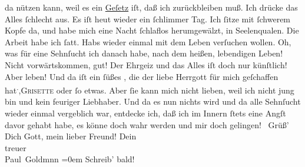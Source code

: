 \begin{ledgroupsized}[t]{13cm}
               da nützen kann, weil es ein \uline{Geſetz} iſt, daß ich
               zurückbleiben muß.\pend
           \pstart
           Ich drücke das Alles ſchlecht aus. Es iſt heut wieder
               ein ſchlimmer Tag. Ich ſitze mit ſchwerem Kopfe da, und habe mich eine Nacht
               ſchlaflos herumgewälzt, in Seelenqualen. Die Arbeit habe ich ſatt. Habs wieder einmal
               mit dem Leben verſuchen wollen. Oh, was für eine Sehnſucht ich danach habe, nach dem
               heißen, lebendigen {\pb}Leben! Nicht vorwärtskommen,
               gut! Der Ehrgeiz und das Alles iſt doch nur künſtlich! Aber leben! Und da iſt ein
               ſüßes \label{K_L02758-111v}\label{K_L02758-111h}, die der
               liebe Herrgott für mich geſchaffen hat\substVorne{}\textsuperscript{.}\substDazwischen{},\substHinten{}{ }\textsc{Grisette} oder ſo etwas. Aber ſie kann mich nicht lieben, weil ich nicht jung bin und
               kein feuriger Liebhaber. Und da es nun nichts wird und da alle Sehnſucht wieder
               einmal vergeblich war, entdecke ich, daß ich im Innern ſtets eine Angſt davor {\pb}gehabt habe, es könne doch wahr werden und mir doch
                  gelingen! {\dotsfour}\pend
           \pstart
           Grüß’ Dich Gott, mein lieber Freund!\pend
           \pstart
           Dein {\\[\baselineskip]}treuer {\\[\baselineskip]}\spacefill\mbox{Paul Goldmnn}\pend
           \leftskip=0em{}\pstart
           \noindent{}Schreib’ bald!\pend
           
         
         \endnumbering{}\end{ledgroupsized}  \newcommand{\dateiname}{L02758}\newcommand{\titel}{Paul Goldmann an Arthur Schnitzler, 5. 12. [1895]}\newcommand{\editorInnen}{Martin Anton Müller und Laura Untner}
      